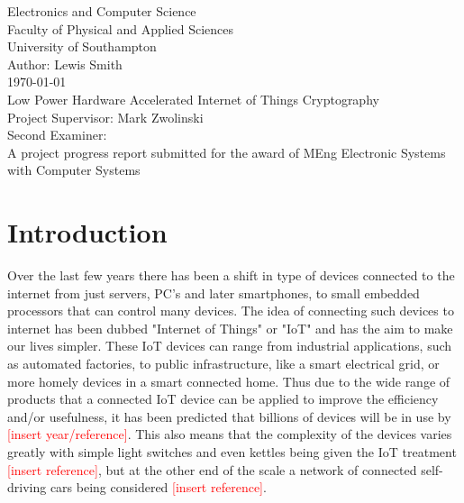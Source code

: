 \documentclass[12pt,twoside,a4paper]{report}
\begin{document}
    
    \begin{titlepage}
    \begin{center}
        \Huge
        Electronics and Computer Science
        \\Faculty of Physical and Applied Sciences
        \\University of Southampton
        \Large
        \\[4cm]Author: Lewis Smith
        \\[1cm]\today
        \Huge
        \\[2cm]Low Power Hardware Accelerated Internet of Things Cryptography
        \large
        \\[4cm]Project Supervisor: Mark Zwolinski
        \\Second Examiner:
        \\[4cm]A project progress report submitted for the award of MEng Electronic Systems with Computer Systems
        
    \end{center}
    \end{titlepage}
    
    \begin{abstract}
    
    \lipsum[1-2]
    
    \end{abstract}
    
    \tableofcontents
    
    \chapter{Introduction}
    Over the last few years there has been a shift in type of devices connected to the internet from just servers, PC's and later smartphones, to small embedded processors that can control many devices. The idea of connecting such devices to internet has been dubbed "Internet of Things" or "IoT" and has the aim to make our lives simpler. These IoT devices can range from industrial applications, such as automated factories, to public infrastructure, like a smart electrical grid, or more homely devices in a smart connected home. Thus due to the wide range of products that a connected IoT device can be applied to improve the efficiency and/or usefulness, it has been predicted that billions of devices will be in use by \textcolor{red}{[insert year/reference]}. This also means that the complexity of the devices varies greatly with simple light switches and even kettles being given the IoT treatment \textcolor{red}{[insert reference]}, but at the other end of the scale a network of connected self-driving cars being considered \textcolor{red}{[insert reference]}.
    
\end{document}

